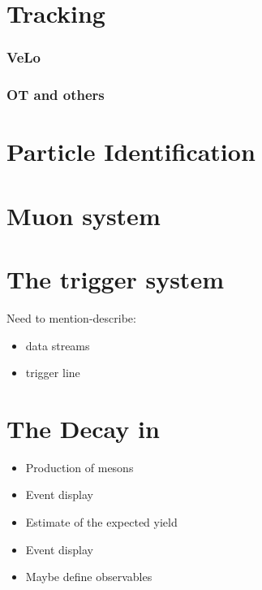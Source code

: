 \section{Tracking}
\subsubsection{VeLo}
\subsubsection{OT and others}

\section{Particle Identification}

\section{Muon system}

\section{The trigger system}
\label{lhcb_trigger}

Need to mention-describe:
\begin{itemize}
  \item data streams
  \item trigger line
\end{itemize}

\section{The \BJpsiKst Decay in \lhcb}
\label{BspsiKst_at_lhcb}
\begin{itemize}
  \item Production of \Bs mesons
  \item Event display
  \item Estimate of the expected yield
  \item Event display
  \item Maybe define observables
\end{itemize}
